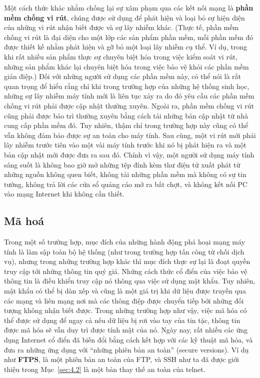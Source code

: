 Một cách thức khác nhằm chống lại sự xâm phạm qua các kết nối mạng là \textbf{phần mềm
  chống vi rút}, chúng được sử dụng để phát hiện và loại bỏ sự hiện diện của những vi rút
nhận biết được và sự lây nhiễm khác. (Thực tế, phần mềm chống vi rút là đại diện cho một
lớp các sản phẩm phần mềm, mỗi phần mềm đó được thiết kế nhằm phát hiện và gỡ bỏ một loại
lây nhiễm cụ thể. Ví dụ, trong khi rất nhiều sản phẩm thực sự chuyên biệt hóa trong việc
kiểm soát vi rút, những sản phẩm khác lại chuyên biệt hóa trong việc bảo vệ khỏi các phần
mềm gián điệp.) Đối với những người sử dụng các phần mềm này, có thể nói là rất quan trọng
để hiểu rằng chỉ khi trong trường hợp của những hệ thống sinh học, những sự lây nhiễm máy
tính mới là liên tục xảy ra do đó yêu cầu các phần mềm chống vi rút phải được cập nhật
thường xuyên. Ngoài ra, phần mềm chống vi rút cũng phải được bảo trì thường xuyên bằng cách tải
những bản cập nhật từ nhà cung cấp phần mềm đó. Tuy nhiên, thậm chí trong trường hợp này
cũng có thể vẫn không đảm bảo được sự an toàn cho máy tính. Sau cùng, một vi rút mới phải
lây nhiễm trước tiên vào một vài máy tính trước khi nó bị phát hiện ra và một bản cập nhật
mới được đưa ra sau đó. Chính vì vậy, một người sử dụng máy tính sáng suốt là không bao
giờ mở những tệp đính kèm thư điện tử xuất phát từ những nguồn không quen biết, không tải
những phần mềm mà không có sự tin tưởng, không trả lời các cửa sổ quảng cáo mở ra bất
chợt, và không kết nối PC vào mạng Internet khi không cần thiết.


\subsection*{Mã hoá}

Trong một số trường hợp, mục đích của những hành động phá hoại mạng máy tính là làm sập
toàn bộ hệ thống (như trong trường hợp tấn công từ chối dịch vụ), nhưng trong những trường
hợp khác thì mục đích thực sự lại là đoạt quyền truy cập tới những thông tin quý
giá. Những cách thức cổ điển của việc bảo vệ thông tin là điều khiển truy cập nó thông qua
việc sử dụng mật khẩu. Tuy nhiên, mật khẩu có thể bị dàn xếp và cũng là một giá trị
khi dữ liệu được truyền qua các mạng và liên mạng nơi mà các thông điệp được chuyển tiếp
bởi những đối tượng không nhận biết được. Trong những trường hợp như vậy, việc mã hóa có
thể được sử dụng để ngay cả nếu dữ liệu bị rơi vào tay của tin tặc, thông tin được
mã hóa sẽ vẫn duy trì được tính mật của nó. Ngày nay, rất nhiều các ứng dụng Internet cổ
điển đã biến đổi bằng cách kết hợp với các kỹ thuật mã hóa, và đưa ra những ứng dụng với
``những phiên bản an toàn'' (secure versions). Ví dụ như \textbf{FTPS}, là một phiên bản
an toàn của FTP, và SSH như ta đã được giới thiệu trong Mục~\ref{sec:4.2} là một bản thay
thế an toàn của telnet.

